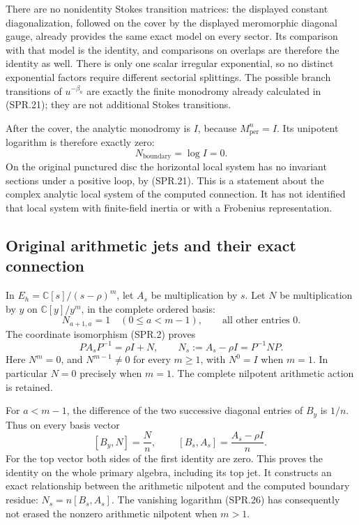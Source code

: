 There are no nonidentity Stokes transition matrices: the displayed
constant diagonalization, followed on the cover by the displayed
meromorphic diagonal gauge, already provides the same exact model
on every sector. Its comparison with that model is the identity,
and comparisons on overlaps are therefore the identity as well.
There is only one scalar irregular exponential, so no distinct
exponential factors require different sectorial splittings.
The possible branch transitions of \(u^{-\beta_a}\) are exactly
the finite monodromy already calculated in (SPR.21); they are not
additional Stokes transitions.

After the cover, the analytic monodromy is \(I\), because
\(M_{\mathrm{per}}^n=I\). Its unipotent logarithm is therefore
exactly zero:
\[
 N_{\mathrm{boundary}}=\log I=0 .
 \tag{SPR.26}
\]
On the original punctured disc the horizontal local system has
no invariant sections under a positive loop, by (SPR.21).
This is a statement about the complex analytic local system
of the computed connection. It has not identified that local
system with finite-field inertia or with a Frobenius representation.

\subsection*{Original arithmetic jets and their exact connection}

In \(E_h=\mathbb C[s]/(s-\rho)^m\), let \(A_s\) be multiplication
by \(s\). Let \(N\) be multiplication by \(y\) on
\(\mathbb C[y]/y^m\), in the complete ordered basis:
\[
 N_{a+1,a}=1\quad(0\leq a<m-1),\qquad
 \text{all other entries }0.
 \tag{SPR.27}
\]
The coordinate isomorphism (SPR.2) proves
\[
 P A_sP^{-1}=\rho I+N,\qquad
 N_s:=A_s-\rho I=P^{-1}NP .
 \tag{SPR.28}
\]
Here \(N^m=0\), and \(N^{m-1}\ne0\) for every \(m\geq1\),
with \(N^0=I\) when \(m=1\). In particular \(N=0\) precisely
when \(m=1\). The complete nilpotent arithmetic action is retained.

For \(a<m-1\), the difference of the two successive diagonal entries
of \(B_y\) is \(1/n\). Thus on every basis vector
\[
 [B_y,N]=\frac Nn,\qquad
 \boxed{\ [B_s,A_s]=\frac{A_s-\rho I}{n}.\ }
 \tag{SPR.29}
\]
For the top vector both sides of the first identity are zero.
This proves the identity on the whole primary algebra, including its
top jet. It constructs an exact relationship between the arithmetic
nilpotent and the computed boundary residue:
\(N_s=n[B_s,A_s]\).
The vanishing logarithm (SPR.26) has consequently not erased the
nonzero arithmetic nilpotent when \(m>1\).

